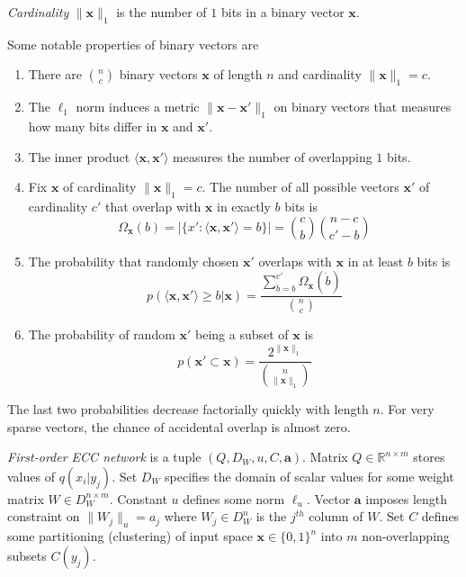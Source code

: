 \documentclass[oneside,english,logo]{amuthesis}
\begin{document}
\begin{definition}
\textit{Cardinality} $\lVert\boldsymbol{x}\rVert_1$ is the number of $1$ bits in a binary vector $\boldsymbol{x}$. 
\end{definition}
\begin{theorem}
Some notable properties of binary vectors are
\begin{enumerate}
	\item There are $\binom{n}{c}$ binary vectors $\boldsymbol{x}$ of length $n$ and cardinality $\lVert\boldsymbol{x}\rVert_1=c$.
	\item The $\ell_1$ norm induces a metric $\lVert\boldsymbol{x}-\boldsymbol{x}'\rVert_1$ on  binary vectors that measures how many bits differ in $\boldsymbol{x}$ and $\boldsymbol{x}'$.
	\item The inner product $\langle\boldsymbol{x},\boldsymbol{x}'\rangle$ measures the number of overlapping $1$ bits. 
	\item Fix $\boldsymbol{x}$ of cardinality $\lVert\boldsymbol{x}\rVert_1=c$. The number of all possible vectors $\boldsymbol{x}'$ of cardinality $c'$ that overlap with $\boldsymbol{x}$ in exactly $b$ bits is 
	\[
	\Omega_{\boldsymbol{x}}(b)=|\{x':\langle\boldsymbol{x},\boldsymbol{x}'\rangle=b\}|=\binom{c}{b}\binom{n-c}{c'-b}
	\]
	\item The probability that randomly chosen $\boldsymbol{x}'$ overlaps with $\boldsymbol{x}$ in at least $b$ bits is
	\[p(\langle\boldsymbol{x},\boldsymbol{x}'\rangle\ge b | \boldsymbol{x})=\frac{\sum_{\dot{b}=b}^{c'}\Omega_{\boldsymbol{x}}(\dot{b})}{\binom{n}{c}}\]
	\item The probability of random $\boldsymbol{x}'$ being a subset of $\boldsymbol{x}$ is
	\[p(\boldsymbol{x}'\subset\boldsymbol{x})=\frac{2^{\lVert\boldsymbol{x}\rVert_1}}{\binom{n}{\lVert\boldsymbol{x}\rVert_1}}\]
\end{enumerate}
\end{theorem}
The last two probabilities decrease factorially quickly with length $n$. For very sparse vectors, the chance of accidental overlap is almost zero. 


\begin{definition}
\textit{First-order ECC network} is a tuple $(Q,D_W,u,C,\boldsymbol{a})$. Matrix $Q\in \mathbb{R}^{n\times m}$ stores values of $q(x_i|y_j)$. Set $D_W$ specifies the domain of scalar values for some weight matrix $W\in D_W^{n \times m}$. Constant $u$ defines some norm $\ell_u$.  Vector $\boldsymbol{a}$ imposes length constraint on $\lVert W_j \rVert_u=a_j$ where $W_j\in D_W^n$ is the $j^{th}$ column of $W$. Set $C$ defines some partitioning (clustering) of input space $\boldsymbol{x}\in \{0,1\}^n$ into $m$ non-overlapping subsets $C(y_j) $.
\end{definition}
\end{document}
